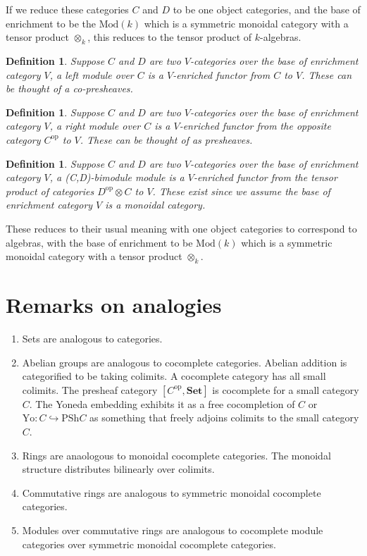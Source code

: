 \documentclass{tufte-book}
\newtheorem{definition}[theorem]{Definition}
\begin{document}
If we reduce these categories $C$ and $D$ to be one object categories, and the base of enrichment to be the $\mathrm{Mod}(k)$ which is a symmetric monoidal category with a tensor product $\otimes_k$, this reduces to the tensor product of $k$-algebras.

\begin{definition}
	Suppose $C$ and $D$ are two $V$-categories over the base of enrichment category $V$, a left module over $C$ is a $V$-enriched functor from $C$ to $V$. These can be thought of a co-presheaves.
\end{definition}

\begin{definition}
	Suppose $C$ and $D$ are two $V$-categories over the base of enrichment category $V$, a right module over $C$ is a $V$-enriched functor from the opposite category $C^\mathrm{op}$ to $V$.
	These can be thought of as presheaves.
\end{definition}

\begin{definition}
	Suppose $C$ and $D$ are two $V$-categories over the base of enrichment category $V$, a (C,D)-bimodule module is a $V$-enriched functor from the tensor product of categories $D^\mathrm{op} \otimes C$ to $V$. These exist since we assume the base of enrichment category $V$ is a monoidal category.
\end{definition}

These reduces to their usual meaning with one object categories to correspond to algebras, with the base of enrichment to be $\mathrm{Mod}(k)$ which is a symmetric monoidal category with a tensor product $\otimes_k$.

\section{Remarks on analogies}

\begin{enumerate}
	\item Sets are analogous to categories.
	\item Abelian groups are analogous to cocomplete categories. Abelian addition is categorified to be taking colimits. A cocomplete category has all small colimits. The presheaf category $[C^\mathrm{op}, \mathbf{Set}]$ is cocomplete for a small category $C$. The Yoneda embedding exhibits it as a free cocompletion of $C$ or $\mathrm{Yo} : C \hookrightarrow \mathrm{PSh}C$ as something that freely adjoins colimits to the small category $C$. 
	\item Rings are anaologous to monoidal cocomplete categories. The monoidal structure distributes bilinearly over colimits.
	\item Commutative rings are analogous to symmetric monoidal cocomplete categories.
	\item Modules over commutative rings are analogous to cocomplete module categories over symmetric monoidal cocomplete categories.
\end{enumerate}
\end{document}
